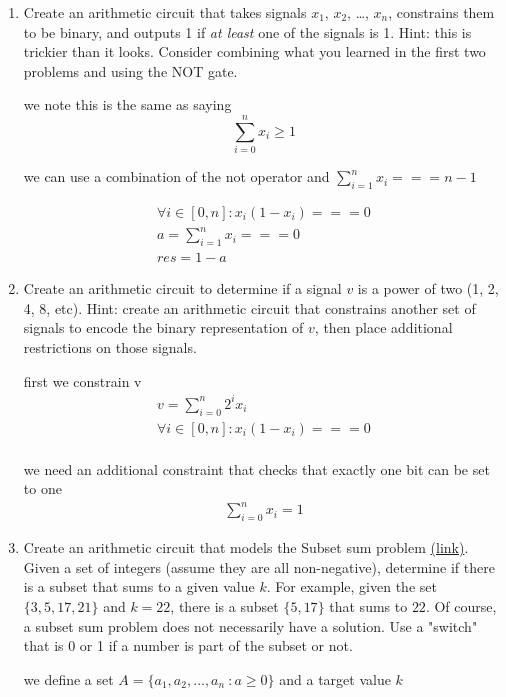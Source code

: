 \documentclass{article}
\begin{document}
\begin{enumerate}
    \item Create an arithmetic circuit that takes signals $x_1$, $x_2$, \ldots, $x_n$, constrains them to be binary, and outputs 1 if \emph{at least} one of the signals is 1. Hint: this is trickier than it looks. Consider combining what you learned in the first two problems and using the NOT gate.
          
     we note this is the same as saying \[\sum_{i=0}^{n} x_i \geq 1\]

     we can use a combination of the not operator and $\sum_{i=1}^n x_i === n-1$ 


     \begin{align*}
          \forall i \in [0, n]: x_i(1-x_i) === 0 \\
          a = \sum_{i=1}^n x_i === 0 \\
          res = 1 - a
     \end{align*}

    
    \item Create an arithmetic circuit to determine if a signal $v$ is a power of two (1, 2, 4, 8, etc). Hint: create an arithmetic circuit that constrains another set of signals to encode the binary representation of $v$, then place additional restrictions on those signals.
    
    first we constrain v 
    \begin{align*}
          v = \sum_{i=0}^{n} 2^i x_i \\
          \forall i \in [0, n]: x_i(1-x_i) === 0 \\
    \end{align*}

    we need an additional constraint that checks that exactly one bit can be set to one
    \begin{align*}
          \sum_{i=0}^{n} x_i = 1
    \end{align*}


    \item Create an arithmetic circuit that models the 
    Subset sum problem \href{https://en.wikipedia.org/wiki/Subset_sum_problem}{(link)}. Given a set of integers (assume they are all non-negative), determine if there is a subset that sums to a given value $k$. For example, given the set $\{3,5,17,21\}$ and $k = 22$, there is a subset $\{5, 17\}$ that sums to $22$. Of course, a subset sum problem does not necessarily have a solution.
    Use a "switch" that is 0 or 1 if a number is part of the subset or not.

    we define a set $A = \{a_1, a_2, \ldots, a_n\ : a \geq 0\}$ and a target value $k$


\end{enumerate}
\end{document}
